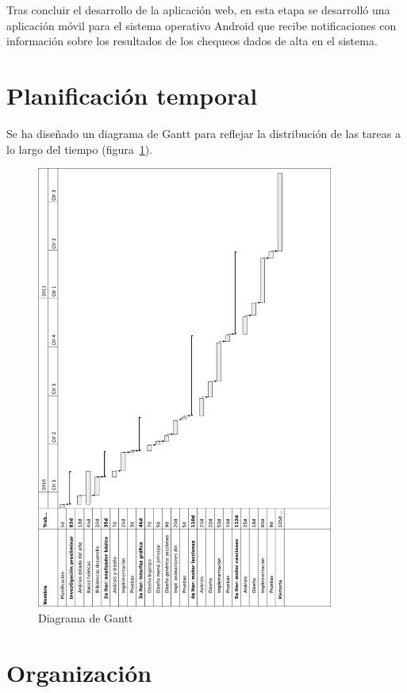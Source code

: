 Tras concluir el desarrollo de la aplicación web, en esta etapa se desarrolló
una aplicación móvil para el sistema operativo Android que recibe notificaciones
con información sobre los resultados de los chequeos dados de alta en el sistema.

\section{Planificación temporal}
Se ha diseñado un diagrama de Gantt para reflejar la distribución de las tareas
a lo largo del tiempo (figura~\ref{fig:gantt}).

\vspace{0.5cm}

\begin{figure}[h!]
  \centering
  \includegraphics[width=0.87\textwidth]{2_calendario/imagen_diagrama_gantt}
  \caption{Diagrama de Gantt}
  \label{fig:gantt}
\end{figure}

\section{Organización}

